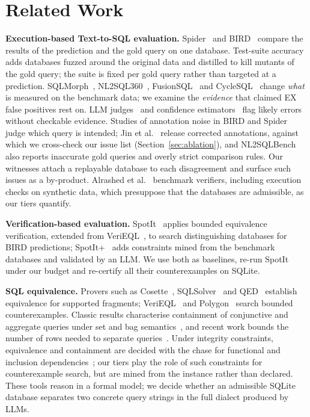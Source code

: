 \section{Related Work}\label{sec:related}

\textbf{Execution-based Text-to-SQL evaluation.} Spider~\cite{yu2018spider} and BIRD~\cite{li2023bird} compare the results of the prediction and the gold query on one database. Test-suite accuracy~\cite{zhong2020testsuite} adds databases fuzzed around the original data and distilled to kill mutants of the gold query; the suite is fixed per gold query rather than targeted at a prediction. SQLMorph~\cite{malekpour2026sqlmorph}, NL2SQL360~\cite{li2024nl2sql360}, FusionSQL~\cite{pham2026fusionsql} and CycleSQL~\cite{fan2025cyclesql} change \emph{what} is measured on the benchmark data; we examine the \emph{evidence} that claimed EX false positives rest on. LLM judges~\cite{kim2025flex} and confidence estimators~\cite{somov2025confidence,maleki2026confidence} flag likely errors without checkable evidence. Studies of annotation noise in BIRD and Spider~\cite{wretblad2024noise,jin2026annotation} judge which query is intended; Jin et al.~\cite{jin2026annotation} release corrected annotations, against which we cross-check our issue list (Section~\ref{sec:ablation}), and NL2SQLBench~\cite{hou2026nl2sqlbench} also reports inaccurate gold queries and overly strict comparison rules. Our witnesses attach a replayable database to each disagreement and surface such issues as a by-product. Alrashed et al.~\cite{alrashed2026verification} benchmark verifiers, including execution checks on synthetic data, which presuppose that the databases are admissible, as our tiers quantify.

\textbf{Verification-based evaluation.} SpotIt~\cite{klopfenstein2026spotit} applies bounded equivalence verification, extended from VeriEQL~\cite{he2024verieql}, to search distinguishing databases for BIRD predictions; SpotIt+~\cite{tremante2026spotitplus} adds constraints mined from the benchmark databases and validated by an LLM. We use both as baselines, re-run SpotIt under our budget and re-certify all their counterexamples on SQLite.

\textbf{SQL equivalence.} Provers such as Cosette~\cite{chu2017cosette}, SQLSolver~\cite{ding2023sqlsolver} and QED~\cite{wang2024qed} establish equivalence for supported fragments; VeriEQL~\cite{he2024verieql} and Polygon~\cite{zhao2025polygon} search bounded counterexamples. Classic results characterise containment of conjunctive and aggregate queries under set and bag semantics~\cite{chandra1977conjunctive,chaudhuri1993real,cohen2007aggregate}, and recent work bounds the number of rows needed to separate queries~\cite{cohen2026fewrows}. Under integrity constraints, equivalence and containment are decided with the chase for functional and inclusion dependencies~\cite{aho1979tableaux,johnson1984containment}; our tiers play the role of such constraints for counterexample search, but are mined from the instance rather than declared. These tools reason in a formal model; we decide whether an admissible SQLite database separates two concrete query strings in the full dialect produced by LLMs.

